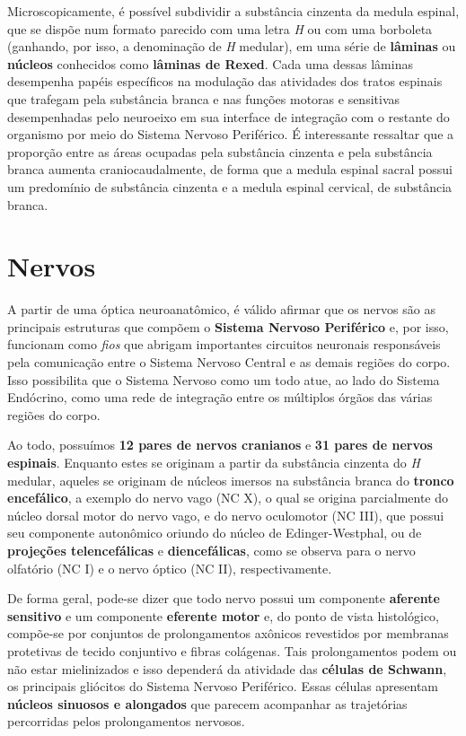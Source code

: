 \documentclass[
]{book}
\theoremstyle{definition}
\theoremstyle{definition}
\theoremstyle{definition}
\theoremstyle{definition}
\theoremstyle{remark}
\begin{document}
Microscopicamente, é possível subdividir a substância cinzenta da medula espinal, que se dispõe num formato parecido com uma letra \emph{H} ou com uma borboleta (ganhando, por isso, a denominação de \emph{H} medular), em uma série de \textbf{lâminas} ou \textbf{núcleos} conhecidos como \textbf{lâminas de Rexed}. Cada uma dessas lâminas desempenha papéis específicos na modulação das atividades dos tratos espinais que trafegam pela substância branca e nas funções motoras e sensitivas desempenhadas pelo neuroeixo em sua interface de integração com o restante do organismo por meio do Sistema Nervoso Periférico. É interessante ressaltar que a proporção entre as áreas ocupadas pela substância cinzenta e pela substância branca aumenta craniocaudalmente, de forma que a medula espinal sacral possui um predomínio de substância cinzenta e a medula espinal cervical, de substância branca.

\hypertarget{nervos}{%
\chapter{Nervos}\label{nervos}}

A partir de uma óptica neuroanatômico, é válido afirmar que os nervos são as principais estruturas que compõem o \textbf{Sistema Nervoso Periférico} e, por isso, funcionam como \emph{fios} que abrigam importantes circuitos neuronais responsáveis pela comunicação entre o Sistema Nervoso Central e as demais regiões do corpo. Isso possibilita que o Sistema Nervoso como um todo atue, ao lado do Sistema Endócrino, como uma rede de integração entre os múltiplos órgãos das várias regiões do corpo.

Ao todo, possuímos \textbf{12 pares de nervos cranianos} e \textbf{31 pares de nervos espinais}. Enquanto estes se originam a partir da substância cinzenta do \emph{H} medular, aqueles se originam de núcleos imersos na substância branca do \textbf{tronco encefálico}, a exemplo do nervo vago (NC X), o qual se origina parcialmente do núcleo dorsal motor do nervo vago, e do nervo oculomotor (NC III), que possui seu componente autonômico oriundo do núcleo de Edinger-Westphal, ou de \textbf{projeções telencefálicas} e \textbf{diencefálicas}, como se observa para o nervo olfatório (NC I) e o nervo óptico (NC II), respectivamente.

De forma geral, pode-se dizer que todo nervo possui um componente \textbf{aferente sensitivo} e um componente \textbf{eferente motor} e, do ponto de vista histológico, compõe-se por conjuntos de prolongamentos axônicos revestidos por membranas protetivas de tecido conjuntivo e fibras colágenas. Tais prolongamentos podem ou não estar mielinizados e isso dependerá da atividade das \textbf{células de Schwann}, os principais gliócitos do Sistema Nervoso Periférico. Essas células apresentam \textbf{núcleos sinuosos e alongados} que parecem acompanhar as trajetórias percorridas pelos prolongamentos nervosos.
\end{document}
